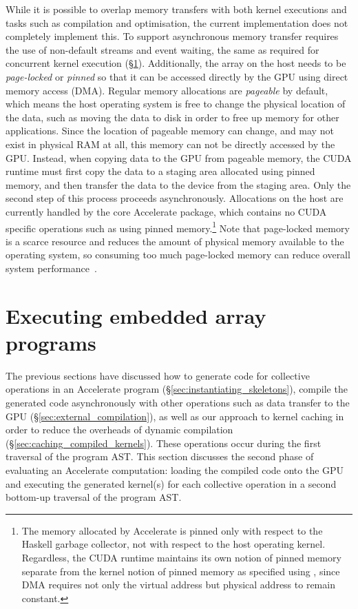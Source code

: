 While it is possible to overlap memory transfers with both kernel executions and
tasks such as compilation and optimisation, the current implementation does not
completely implement this. To support asynchronous memory transfer requires the
use of non-default streams and event waiting, the same as required for
concurrent kernel execution (\S\ref{sec:executing_programs}).
Additionally, the array on the host needs
to be \emph{page-locked} or \emph{pinned} so that it can be accessed directly by
the GPU using direct memory access (DMA). Regular memory allocations are
\emph{pageable} by default, which means the host operating system is free to
change the physical location of the data, such as moving the data to disk in
order to free up memory for other applications. Since the location of pageable
memory can change, and may not exist in physical RAM at all, this memory can not
be directly accessed by the GPU\@. Instead, when copying data to the GPU from
pageable memory, the CUDA runtime must first copy the data to a staging area
allocated using pinned memory, and then transfer the data to the device from the
staging area. Only the second step of this process proceeds asynchronously.
Allocations on the host are currently handled by the core Accelerate package,
which contains no CUDA specific operations such as using pinned
memory.\footnote{The memory allocated by Accelerate is pinned only with respect
to the Haskell garbage collector, not with respect to the host operating kernel.
Regardless, the CUDA runtime maintains its own notion of pinned memory
separate from the kernel notion of pinned memory as specified using
, since DMA requires not only the virtual address but physical
address to remain constant.} Note that page-locked memory is a scarce resource
and reduces the amount of physical memory available to the operating system, so
consuming too much page-locked memory can reduce overall system
performance~\cite{NVIDIA:2012wf}.


\section{Executing embedded array programs}
\label{sec:executing_programs}

The previous sections have discussed how to generate code for collective
operations in an Accelerate program (\S\ref{sec:instantiating_skeletons}),
compile the generated code asynchronously with other operations such as data
transfer to the GPU (\S\ref{sec:external_compilation}), as well as our approach
to kernel caching in order to reduce the overheads of dynamic compilation
(\S\ref{sec:caching_compiled_kernels}). These operations occur during the first
traversal of the program AST\@. This section discusses the second phase of
evaluating an Accelerate computation: loading the compiled code onto the GPU and
executing the generated kernel(s) for each collective operation in a second
bottom-up traversal of the program AST\@.


